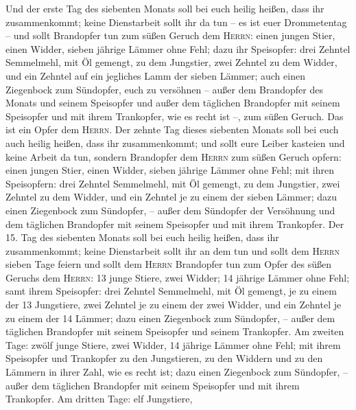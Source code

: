  Und der erste Tag des siebenten Monats soll bei euch
heilig heißen, dass ihr zusammenkommt; keine Dienstarbeit sollt ihr da
tun -- es ist euer Drommetentag --  und sollt Brandopfer
tun zum süßen Geruch dem \textsc{Herrn}: einen jungen Stier, einen
Widder, sieben jährige Lämmer ohne Fehl;  dazu ihr
Speisopfer: drei Zehntel Semmelmehl, mit Öl gemengt, zu dem Jungstier,
zwei Zehntel zu dem Widder,  und ein Zehntel auf ein
jegliches Lamm der sieben Lämmer;  auch einen Ziegenbock
zum Sündopfer, euch zu versöhnen --  außer dem Brandopfer
des Monats und seinem Speisopfer und außer dem täglichen Brandopfer mit
seinem Speisopfer und mit ihrem Trankopfer, wie es recht ist --, zum
süßen Geruch. Das ist ein Opfer dem \textsc{Herrn}.  Der
zehnte Tag dieses siebenten Monats soll bei euch auch heilig heißen,
dass ihr zusammenkommt; und sollt eure Leiber kasteien und keine Arbeit
da tun,  sondern Brandopfer dem \textsc{Herrn} zum süßen
Geruch opfern: einen jungen Stier, einen Widder, sieben jährige Lämmer
ohne Fehl;  mit ihren Speisopfern: drei Zehntel
Semmelmehl, mit Öl gemengt, zu dem Jungstier, zwei Zehntel zu dem
Widder,  und ein Zehntel je zu einem der sieben Lämmer;
 dazu einen Ziegenbock zum Sündopfer, -- außer dem
Sündopfer der Versöhnung und dem täglichen Brandopfer mit seinem
Speisopfer und mit ihrem Trankopfer.  Der 15. Tag des
siebenten Monats soll bei euch heilig heißen, dass ihr zusammenkommt;
keine Dienstarbeit sollt ihr an dem tun und sollt dem \textsc{Herrn}
sieben Tage feiern  und sollt dem \textsc{Herrn}
Brandopfer tun zum Opfer des süßen Geruchs dem \textsc{Herrn}: 13 junge
Stiere, zwei Widder; 14 jährige Lämmer ohne Fehl;  samt
ihrem Speisopfer: drei Zehntel Semmelmehl, mit Öl gemengt, je zu einem
der 13 Jungstiere, zwei Zehntel je zu einem der zwei Widder,
 und ein Zehntel je zu einem der 14 Lämmer;
 dazu einen Ziegenbock zum Sündopfer, -- außer dem
täglichen Brandopfer mit seinem Speisopfer und seinem Trankopfer.
 Am zweiten Tage: zwölf junge Stiere, zwei Widder, 14
jährige Lämmer ohne Fehl;  mit ihrem Speisopfer und
Trankopfer zu den Jungstieren, zu den Widdern und zu den Lämmern in
ihrer Zahl, wie es recht ist;  dazu einen Ziegenbock zum
Sündopfer, -- außer dem täglichen Brandopfer mit seinem Speisopfer und
mit ihrem Trankopfer.  Am dritten Tage: elf Jungstiere,
